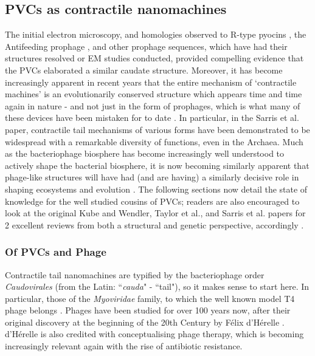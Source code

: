 \subsection{PVCs as contractile nanomachines}
The initial electron microscopy, and homologies observed to R-type pyocins \citep{Ge2015}, the Antifeeding prophage \citep{Heymann2013},  and other prophage sequences, which have had their structures resolved or EM studies conducted, provided compelling evidence that the PVCs elaborated a similar caudate structure. Moreover, it has become increasingly apparent in recent years that the entire mechanism of `contractile machines' is an evolutionarily conserved structure which appears time and time again in nature - and not just in the form of prophages, which is what many of these devices have been mistaken for to date \citep{Kube2015a, Sarris2014, Brackmann2017}. In particular, in the Sarris et al. paper, contractile tail mechanisms of various forms have been demonstrated to be widespread with a remarkable diversity of functions, even in the Archaea. Much as the bacteriophage biosphere has become increasingly well understood to actively shape the bacterial biosphere, it is now becoming similarly apparent that phage-like structures will have had (and are having) a similarly decisive role in shaping ecosystems and evolution \citep{Richard2014a}. The following sections now detail the state of knowledge for the well studied cousins of PVCs; readers are also encouraged to look at the original Kube and Wendler, Taylor et al., and Sarris et al. papers for 2 excellent reviews from both a structural and genetic perspective, accordingly \citep{Kube2015a, Sarris2014, Taylor2018a}.

\subsubsection{Of PVCs and Phage}
Contractile tail nanomachines are typified by the bacteriophage order \emph{Caudovirales} (from the Latin: ``\emph{cauda}" - ``tail"), so it makes sense to start here. In particular, those of the \emph{Myoviridae} family, to which the well known model T4 phage belongs \citep{Ackermann1998}. Phages have been studied for over 100 years now, after their original discovery at the beginning of the 20th Century by F\'elix d'H\'erelle \citep{DHerelle1917}. d'H\'erelle is also credited with conceptualising phage therapy, which is becoming increasingly relevant again with the rise of antibiotic resistance.

